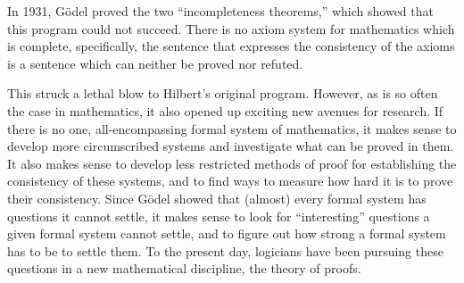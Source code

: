 \documentclass[../../../include/open-logic-section]{subfiles}
\begin{document}
In 1931, G\"odel proved the two ``incompleteness theorems,'' which
showed that this program could not succeed. There is no axiom system
for mathematics which is complete, specifically, the sentence that
expresses the consistency of the axioms is a sentence which can
neither be proved nor refuted.

This struck a lethal blow to Hilbert's original program. However, as
is so often the case in mathematics, it also opened up exciting new
avenues for research. If there is no one, all-encompassing formal
system of mathematics, it makes sense to develop more circumscribed
systems and investigate what can be proved in them. It also makes
sense to develop less restricted methods of proof for establishing the
consistency of these systems, and to find ways to measure how hard it
is to prove their consistency.  Since G\"odel showed that (almost)
every formal system has questions it cannot settle, it makes sense to
look for ``interesting'' questions a given formal system cannot
settle, and to figure out how strong a formal system has to be to
settle them. To the present day, logicians have been pursuing these
questions in a new mathematical discipline, the theory of proofs.
\end{document}
